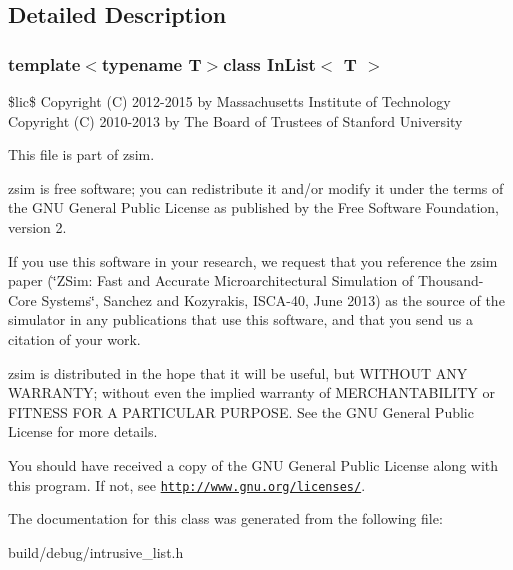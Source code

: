 \subsection{Detailed Description}
\subsubsection*{template$<$typename T$>$class In\-List$<$ T $>$}

\$lic\$ Copyright (C) 2012-\/2015 by Massachusetts Institute of Technology Copyright (C) 2010-\/2013 by The Board of Trustees of Stanford University

This file is part of zsim.

zsim is free software; you can redistribute it and/or modify it under the terms of the G\-N\-U General Public License as published by the Free Software Foundation, version 2.

If you use this software in your research, we request that you reference the zsim paper (\char`\"{}\-Z\-Sim\-: Fast and Accurate Microarchitectural Simulation of
\-Thousand-\/\-Core Systems\char`\"{}, Sanchez and Kozyrakis, I\-S\-C\-A-\/40, June 2013) as the source of the simulator in any publications that use this software, and that you send us a citation of your work.

zsim is distributed in the hope that it will be useful, but W\-I\-T\-H\-O\-U\-T A\-N\-Y W\-A\-R\-R\-A\-N\-T\-Y; without even the implied warranty of M\-E\-R\-C\-H\-A\-N\-T\-A\-B\-I\-L\-I\-T\-Y or F\-I\-T\-N\-E\-S\-S F\-O\-R A P\-A\-R\-T\-I\-C\-U\-L\-A\-R P\-U\-R\-P\-O\-S\-E. See the G\-N\-U General Public License for more details.

You should have received a copy of the G\-N\-U General Public License along with this program. If not, see \href{http://www.gnu.org/licenses/}{\tt http\-://www.\-gnu.\-org/licenses/}. 

The documentation for this class was generated from the following file\-:\begin{DoxyCompactItemize}
\item 
build/debug/intrusive\-\_\-list.\-h\end{DoxyCompactItemize}
